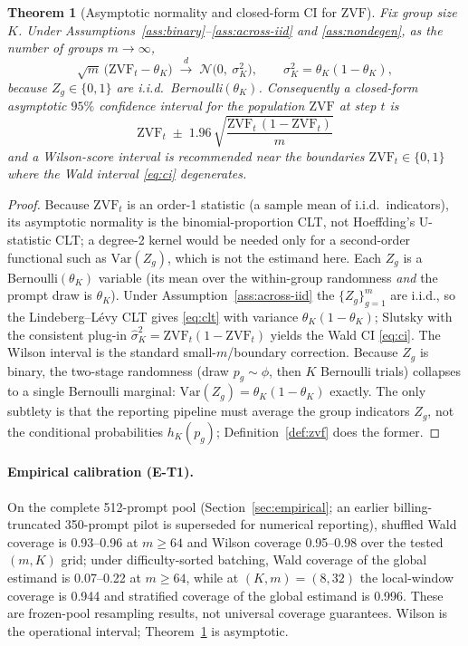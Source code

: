 \documentclass[11pt]{article}
\theoremstyle{plain}
\newtheorem{theorem}{Theorem}
\theoremstyle{definition}
\theoremstyle{remark}
\newcommand{\ZVF}{\ensuremath{\mathrm{ZVF}}}
\newcommand{\Var}{\ensuremath{\mathrm{Var}}}
\newcommand{\1}{\mathbb{1}}
\begin{document}
\begin{theorem}[Asymptotic normality and closed-form CI for \ZVF{}]
\label{thm:T1}
Fix group size $K$. Under Assumptions~\ref{ass:binary}--\ref{ass:across-iid}
and \ref{ass:nondegen}, as the number of groups $m\to\infty$,
\begin{equation}\label{eq:clt}
\sqrt{m}\,\big(\ZVF_t - \theta_K\big)
\;\xrightarrow{\;d\;}\; \mathcal{N}\!\big(0,\ \sigma_K^2\big),
\qquad
\sigma_K^2 = \theta_K(1-\theta_K),
\end{equation}
because $Z_g\in\{0,1\}$ are i.i.d.\ Bernoulli$(\theta_K)$. Consequently a
closed-form asymptotic $95\%$ confidence interval for the population \ZVF{} at
step $t$ is
\begin{equation}\label{eq:ci}
\boxed{\;
\ZVF_t \;\pm\; 1.96\,\sqrt{\frac{\ZVF_t\,(1-\ZVF_t)}{m}}\;}
\end{equation}
and a Wilson-score interval is recommended near the boundaries
$\ZVF_t\in\{0,1\}$ where the Wald interval \eqref{eq:ci} degenerates.
\end{theorem}
\begin{proof}
Because $\ZVF_t$ is an order-1 statistic (a sample mean of i.i.d.\ indicators),
its asymptotic normality is the binomial-proportion CLT, not Hoeffding's
U-statistic CLT; a degree-2 kernel would be needed only for a second-order
functional such as $\Var(Z_g)$, which is not the estimand here.
Each $Z_g$ is a Bernoulli$(\theta_K)$ variable (its mean over the within-group
randomness \emph{and} the prompt draw is $\theta_K$). Under
Assumption~\ref{ass:across-iid} the $\{Z_g\}_{g=1}^m$ are i.i.d., so the
Lindeberg--L\'evy CLT gives \eqref{eq:clt} with variance
$\theta_K(1-\theta_K)$; Slutsky with the consistent plug-in
$\widehat\sigma_K^2=\ZVF_t(1-\ZVF_t)$ yields the Wald CI \eqref{eq:ci}.
The Wilson interval is the standard small-$m$/boundary correction.
Because $Z_g$ is binary, the two-stage randomness (draw $p_g\sim\phi$, then
$K$ Bernoulli trials) collapses to a single Bernoulli marginal:
$\Var(Z_g)=\theta_K(1-\theta_K)$ exactly. The only subtlety is that the
reporting pipeline must average the group indicators $Z_g$, not the conditional
probabilities $h_K(p_g)$; Definition~\ref{def:zvf} does the former.
\end{proof}

\paragraph{Empirical calibration (E-T1).} On the complete 512-prompt pool
(Section~\ref{sec:empirical}; an earlier billing-truncated 350-prompt pilot is
superseded for numerical reporting), shuffled Wald coverage is 0.93--0.96 at
$m\ge64$ and Wilson coverage 0.95--0.98 over the tested $(m,K)$ grid; under
difficulty-sorted batching, Wald coverage of the global estimand is 0.07--0.22
at $m\ge64$, while at $(K,m)=(8,32)$ the local-window coverage is 0.944 and
stratified coverage of the global estimand is 0.996. These are frozen-pool
resampling results, not universal coverage guarantees. Wilson is the
operational interval; Theorem~\ref{thm:T1} is asymptotic.
\end{document}
